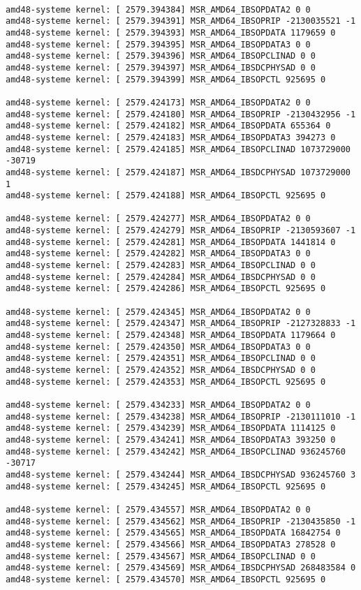     \begin{verbatim}

amd48-systeme kernel: [ 2579.394384] MSR_AMD64_IBSOPDATA2 0 0
amd48-systeme kernel: [ 2579.394391] MSR_AMD64_IBSOPRIP -2130035521 -1
amd48-systeme kernel: [ 2579.394393] MSR_AMD64_IBSOPDATA 1179659 0
amd48-systeme kernel: [ 2579.394395] MSR_AMD64_IBSOPDATA3 0 0
amd48-systeme kernel: [ 2579.394396] MSR_AMD64_IBSOPCLINAD 0 0
amd48-systeme kernel: [ 2579.394397] MSR_AMD64_IBSDCPHYSAD 0 0
amd48-systeme kernel: [ 2579.394399] MSR_AMD64_IBSOPCTL 925695 0

amd48-systeme kernel: [ 2579.424173] MSR_AMD64_IBSOPDATA2 0 0
amd48-systeme kernel: [ 2579.424180] MSR_AMD64_IBSOPRIP -2130432956 -1
amd48-systeme kernel: [ 2579.424182] MSR_AMD64_IBSOPDATA 655364 0
amd48-systeme kernel: [ 2579.424183] MSR_AMD64_IBSOPDATA3 394273 0
amd48-systeme kernel: [ 2579.424185] MSR_AMD64_IBSOPCLINAD 1073729000 -30719
amd48-systeme kernel: [ 2579.424187] MSR_AMD64_IBSDCPHYSAD 1073729000 1
amd48-systeme kernel: [ 2579.424188] MSR_AMD64_IBSOPCTL 925695 0

amd48-systeme kernel: [ 2579.424277] MSR_AMD64_IBSOPDATA2 0 0
amd48-systeme kernel: [ 2579.424279] MSR_AMD64_IBSOPRIP -2130593607 -1
amd48-systeme kernel: [ 2579.424281] MSR_AMD64_IBSOPDATA 1441814 0
amd48-systeme kernel: [ 2579.424282] MSR_AMD64_IBSOPDATA3 0 0
amd48-systeme kernel: [ 2579.424283] MSR_AMD64_IBSOPCLINAD 0 0
amd48-systeme kernel: [ 2579.424284] MSR_AMD64_IBSDCPHYSAD 0 0
amd48-systeme kernel: [ 2579.424286] MSR_AMD64_IBSOPCTL 925695 0

amd48-systeme kernel: [ 2579.424345] MSR_AMD64_IBSOPDATA2 0 0
amd48-systeme kernel: [ 2579.424347] MSR_AMD64_IBSOPRIP -2127328833 -1
amd48-systeme kernel: [ 2579.424348] MSR_AMD64_IBSOPDATA 1179664 0
amd48-systeme kernel: [ 2579.424350] MSR_AMD64_IBSOPDATA3 0 0
amd48-systeme kernel: [ 2579.424351] MSR_AMD64_IBSOPCLINAD 0 0
amd48-systeme kernel: [ 2579.424352] MSR_AMD64_IBSDCPHYSAD 0 0
amd48-systeme kernel: [ 2579.424353] MSR_AMD64_IBSOPCTL 925695 0

amd48-systeme kernel: [ 2579.434233] MSR_AMD64_IBSOPDATA2 0 0
amd48-systeme kernel: [ 2579.434238] MSR_AMD64_IBSOPRIP -2130111010 -1
amd48-systeme kernel: [ 2579.434239] MSR_AMD64_IBSOPDATA 1114125 0
amd48-systeme kernel: [ 2579.434241] MSR_AMD64_IBSOPDATA3 393250 0
amd48-systeme kernel: [ 2579.434242] MSR_AMD64_IBSOPCLINAD 936245760 -30717
amd48-systeme kernel: [ 2579.434244] MSR_AMD64_IBSDCPHYSAD 936245760 3
amd48-systeme kernel: [ 2579.434245] MSR_AMD64_IBSOPCTL 925695 0

amd48-systeme kernel: [ 2579.434557] MSR_AMD64_IBSOPDATA2 0 0
amd48-systeme kernel: [ 2579.434562] MSR_AMD64_IBSOPRIP -2130435850 -1
amd48-systeme kernel: [ 2579.434565] MSR_AMD64_IBSOPDATA 16842754 0
amd48-systeme kernel: [ 2579.434566] MSR_AMD64_IBSOPDATA3 278528 0
amd48-systeme kernel: [ 2579.434567] MSR_AMD64_IBSOPCLINAD 0 0
amd48-systeme kernel: [ 2579.434569] MSR_AMD64_IBSDCPHYSAD 268483584 0
amd48-systeme kernel: [ 2579.434570] MSR_AMD64_IBSOPCTL 925695 0

    \end{verbatim}
